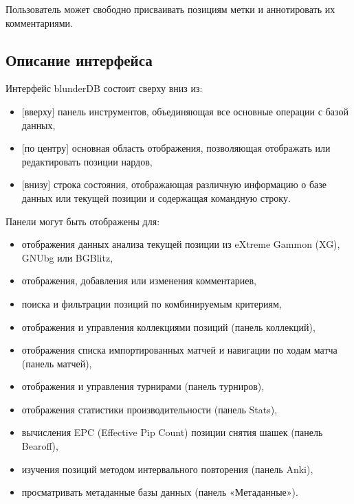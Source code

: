 \documentclass[letterpaper,10pt,russian]{sphinxmanual}
\begin{document}
\sphinxAtStartPar
Пользователь может свободно присваивать позициям метки и аннотировать их комментариями.


\subsection{Описание интерфейса}
\label{\detokenize{manuel:description-de-l-interface}}
\sphinxAtStartPar
Интерфейс blunderDB состоит сверху вниз из:
\begin{itemize}
\item {} 
\sphinxAtStartPar
{[}вверху{]} панель инструментов, объединяющая все основные операции с базой данных,

\item {} 
\sphinxAtStartPar
{[}по центру{]} основная область отображения, позволяющая отображать или редактировать позиции нардов,

\item {} 
\sphinxAtStartPar
{[}внизу{]} строка состояния, отображающая различную информацию о базе данных или текущей позиции и содержащая командную строку.

\end{itemize}

\sphinxAtStartPar
Панели могут быть отображены для:
\begin{itemize}
\item {} 
\sphinxAtStartPar
отображения данных анализа текущей позиции из eXtreme Gammon (XG), GNUbg или BGBlitz,

\item {} 
\sphinxAtStartPar
отображения, добавления или изменения комментариев,

\item {} 
\sphinxAtStartPar
поиска и фильтрации позиций по комбинируемым критериям,

\item {} 
\sphinxAtStartPar
отображения и управления коллекциями позиций (панель коллекций),

\item {} 
\sphinxAtStartPar
отображения списка импортированных матчей и навигации по ходам матча (панель матчей),

\item {} 
\sphinxAtStartPar
отображения и управления турнирами (панель турниров),

\item {} 
\sphinxAtStartPar
отображения статистики производительности (панель Stats),

\item {} 
\sphinxAtStartPar
вычисления EPC (Effective Pip Count) позиции снятия шашек (панель Bearoff),

\item {} 
\sphinxAtStartPar
изучения позиций методом интервального повторения (панель Anki),

\item {} 
\sphinxAtStartPar
просматривать метаданные базы данных (панель «Метаданные»).

\end{itemize}
\end{document}
